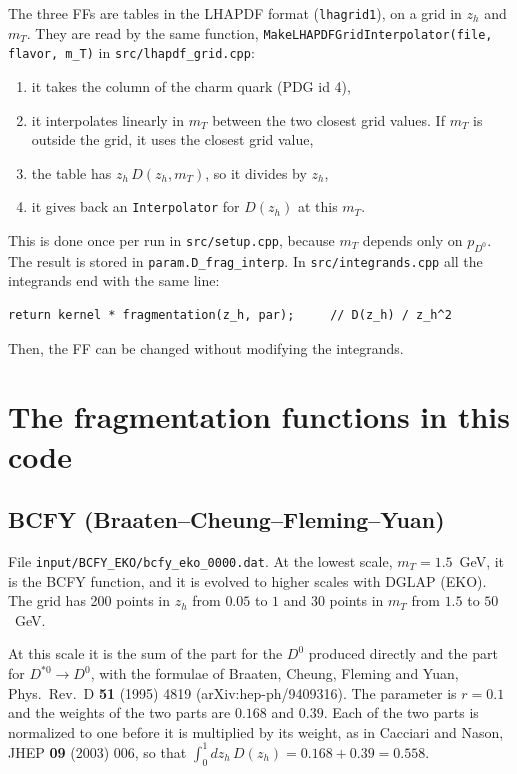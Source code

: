 \documentclass{article}
\begin{document}
The three FFs are tables in the LHAPDF format (\texttt{lhagrid1}), on a grid
in $z_h$ and $m_T$. They are read by the same function,
\texttt{MakeLHAPDFGridInterpolator(file, flavor, m\_T)} in
\texttt{src/lhapdf\_grid.cpp}:
\begin{enumerate}
\item it takes the column of the charm quark (PDG id 4),
\item it interpolates linearly in $m_T$ between the two closest grid values. If
  $m_T$ is outside the grid, it uses the closest grid value,
\item the table has $z_h\,D(z_h,m_T)$, so it divides by $z_h$,
\item it gives back an \texttt{Interpolator} for $D(z_h)$ at this $m_T$.
\end{enumerate}
This is done once per run in \texttt{src/setup.cpp}, because $m_T$ depends only on $p_{D^0}$. The result
is stored in \texttt{param.D\_frag\_interp}. In \texttt{src/integrands.cpp} all
the integrands end with the same line:
\begin{verbatim}
return kernel * fragmentation(z_h, par);     // D(z_h) / z_h^2
\end{verbatim}
Then, the FF can be changed without modifying the integrands.

\section{The fragmentation functions in this code}

\subsection{BCFY (Braaten--Cheung--Fleming--Yuan)}

File \texttt{input/BCFY\_EKO/bcfy\_eko\_0000.dat}. At the lowest scale,
$m_T = 1.5$~GeV, it is the BCFY function, and it is evolved to higher scales
with DGLAP (EKO). The grid has 200 points in $z_h$ from $0.05$ to $1$ and 30
points in $m_T$ from $1.5$ to $50$~GeV.

At this scale it is the sum of the part for the $D^0$ produced directly and the
part for $D^{*0}\to D^0$, with the formulae of Braaten, Cheung, Fleming and
Yuan, Phys.\ Rev.\ D \textbf{51} (1995) 4819 (arXiv:hep-ph/9409316). The
parameter is $r = 0.1$ and the weights of the two parts are $0.168$ and
$0.39$. Each of the two parts is normalized to one before it is multiplied by
its weight, as in Cacciari and Nason, JHEP \textbf{09} (2003) 006, so that
$\int_0^1 dz_h\, D(z_h) = 0.168 + 0.39 = 0.558$.
\end{document}
